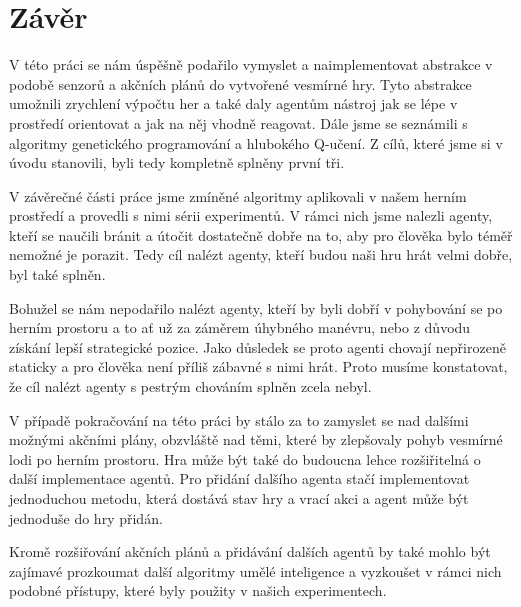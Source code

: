 \chapter*{Závěr}
V této práci se nám úspěšně podařilo vymyslet a naimplementovat abstrakce v podobě senzorů a akčních plánů do vytvořené vesmírné hry.
Tyto abstrakce umožnili zrychlení výpočtu her a také daly agentům nástroj jak se lépe v prostředí orientovat a jak na něj vhodně reagovat.
Dále jsme se seznámili s algoritmy genetického programování a hlubokého Q-učení.
Z cílů, které jsme si v úvodu stanovili, byli tedy kompletně splněny první tři.

V závěrečné části práce jsme zmíněné algoritmy aplikovali v našem herním prostředí a provedli s nimi sérii experimentů.
V rámci nich jsme nalezli agenty, kteří se naučili bránit a útočit dostatečně dobře na to, aby pro člověka bylo téměř nemožné je porazit.
Tedy cíl nalézt agenty, kteří budou naši hru hrát velmi dobře, byl také splněn.

Bohužel se nám nepodařilo nalézt agenty, kteří by byli dobří v pohybování se po herním prostoru a to ať už za záměrem úhybného manévru, nebo z důvodu získání lepší strategické pozice.
Jako důsledek se proto agenti chovají nepřirozeně staticky a pro člověka není příliš zábavné s nimi hrát.
Proto musíme konstatovat, že cíl nalézt agenty s pestrým chováním splněn zcela nebyl.

V případě pokračování na této práci by stálo za to zamyslet se nad dalšími možnými akčními plány, obzvláště nad těmi, které by zlepšovaly pohyb vesmírné lodi po herním prostoru.
Hra může být také do budoucna lehce rozšiřitelná o další implementace agentů. Pro přidání dalšího agenta stačí implementovat jednoduchou metodu, která dostává stav hry a vrací akci a agent může být jednoduše do hry přidán. 

Kromě rozšiřování akčních plánů a přidávání dalších agentů by také mohlo být zajímavé prozkoumat další algoritmy umělé inteligence a vyzkoušet v rámci nich podobné přístupy, které byly použity v našich experimentech.


